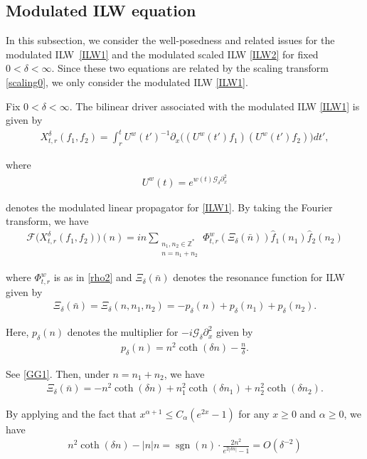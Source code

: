 \documentclass[letterpaper, 11pt,  reqno]{amsart}
\DeclareMathOperator{\sgn}{sgn}
\newcommand{\1}{\hspace{0.5mm}\text{I}\hspace{0.5mm}}
\newcommand{\noi}{\noindent}
\newcommand{\Z}{\mathbb{Z}}
\newcommand{\F}{\mathcal{F}}
\newcommand{\al}{\alpha}
\newcommand{\dl}{\delta}
\newcommand{\ft}{\widehat}
\newcommand{\dx}{\partial_x}
\newcommand{\Gdl}{\mathcal{G}_{\dl} }
\newcommand{\uw}{U^w}
\newcommand{\sub}{\substack}
\numberwithin{equation}{section}
\numberwithin{theorem}{section}
\begin{document}
\subsection{Modulated ILW equation}
\label{SUBSEC:BO2}

In this subsection, we consider 
the well-posedness and related issues for 
the modulated ILW~\eqref{ILW1}
and the modulated scaled ILW \eqref{ILW2}
for fixed $0 < \dl < \infty$.
Since these two equations are related by 
the scaling transform \eqref{scaling0}, 
we only consider the modulated ILW \eqref{ILW1}.


Fix $0 < \dl < \infty$. The bilinear driver associated with
the modulated ILW \eqref{ILW1} is given by 
\begin{align}
X^\dl_{t,r}( f _1, f _2)
=\int_r^t  \uw  (t')^{-1}
\dx \big( (\uw (t')   f _1 )(\uw (t')  f_2) \big)dt',
\label{IL1}
\end{align}


\noi
where 
\begin{align}
\uw (t)=e^{ w(t)\Gdl \dx^2}
\label{IL2}
\end{align}

\noi
denotes 
the modulated linear propagator
for \eqref{ILW1}.
By taking the Fourier transform, we have 
\begin{align}
\F\big( X^\dl_{t,r}  ( f _1, f _2) \big)(n)  =
in  \sum_{ \sub {n_1, n_2 \in \Z^*\\ n = n_1+n_2}}
 \Phi_{t,r}^{w}(\Xi_\dl (\bar n))\ft  f_1 ( n_1 )  \ft   f_2 (n_2)
\label{IL3}
\end{align}


\noi
where $\Phi_{t,r}^w$ is as in  \eqref{rho2}
and 
$\Xi_\dl (\bar n)$ denotes the resonance function for ILW given by 
\begin{align}
\Xi_\dl (\bar n)
= \Xi_\dl(n,n_1,n_2) = - p_\dl(n)  +   p_\dl(n_1) +  p_\dl(n_2).
\label{IL4}
\end{align}

\noi
Here, $p_\dl(n)$ denotes the multiplier for $-i \Gdl \dx^2$ given by 
\begin{align}
p_\dl(n)=
n^2 \coth(\dl n) -\frac{n}{\dl} .
\label{IL5}
\end{align}


\noi
See \eqref{GG1}.
Then, under $n = n_1 + n_2$, we have
\begin{align}
\Xi_\dl (\bar n)
= 
- n^2 \coth(\dl n)
+ n_1^2 \coth(\dl n_1)
+ n_2^2 \coth(\dl n_2).
\label{IL6}
\end{align}

\noi
By applying 
\cite[(2.7)]{CLOP}
and 
the fact that  $x^{\al +1} \le C_\al( e^{2x} - 1)$ for any $x \ge  0$
and $\al \ge 0$, 
we have 
\begin{align}
n^2 \coth (\dl n) - |n|n = \sgn(n) \cdot \frac {2n^2} {e^{2|\dl n|} - 1}
= O( \dl^{-2})
\label{IL7}
\end{align}
\end{document}
